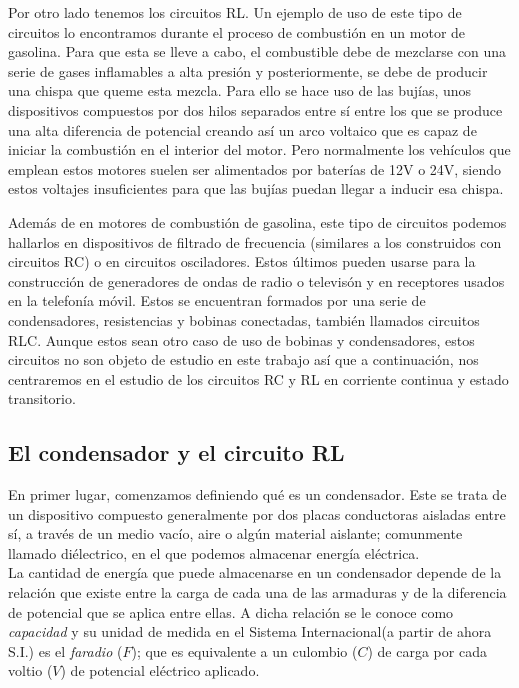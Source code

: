 \documentclass[../main.tex]{subfiles}
\begin{document}
Por otro lado tenemos los circuitos RL. Un ejemplo de uso de este tipo de circuitos lo encontramos durante el proceso de combustión en un motor de gasolina. Para que esta se lleve a cabo, el combustible debe de mezclarse con una serie de gases inflamables a alta presión y posteriormente, se debe de producir una chispa que queme esta mezcla. Para ello se hace uso de las bujías, unos dispositivos compuestos por dos hilos separados entre sí entre los que se produce una alta diferencia de potencial creando así un arco voltaico que es capaz de iniciar la combustión en el interior del motor. Pero normalmente los vehículos que emplean estos motores suelen ser alimentados por baterías de 12V o 24V, siendo estos voltajes insuficientes para que las bujías puedan llegar a inducir esa chispa.

Además de en motores de combustión de gasolina, este tipo de circuitos podemos hallarlos en dispositivos de filtrado de frecuencia (similares a los construidos con circuitos RC) o en circuitos osciladores. Estos últimos pueden usarse para la construcción de generadores de ondas de radio o televisón y en receptores usados en la telefonía móvil. Estos se encuentran formados por una serie de condensadores, resistencias y bobinas conectadas, también llamados circuitos RLC. Aunque estos sean otro caso de uso de bobinas y condensadores, estos circuitos no son objeto de estudio en este trabajo así que a continuación, nos centraremos en el estudio de los circuitos RC y RL en corriente continua y estado transitorio.


\subsection{El condensador y el circuito RL}
En primer lugar, comenzamos definiendo qué es un condensador. Este se trata de un dispositivo compuesto generalmente por dos placas conductoras aisladas entre sí, a través de un medio vacío, aire o algún material aislante; comunmente llamado diélectrico, en el que podemos almacenar energía eléctrica.\\ 

La cantidad de energía que puede almacenarse en un condensador depende de la relación que existe entre la carga de cada una de las armaduras y de la diferencia de potencial que se aplica entre ellas. A dicha relación se le conoce como \textit{capacidad} y su unidad de medida en el Sistema Internacional(a partir de ahora S.I.) es el \textit{faradio} ($F$); que es equivalente a un culombio ($C$) de carga por cada voltio ($V$) de potencial eléctrico aplicado.
\end{document}
